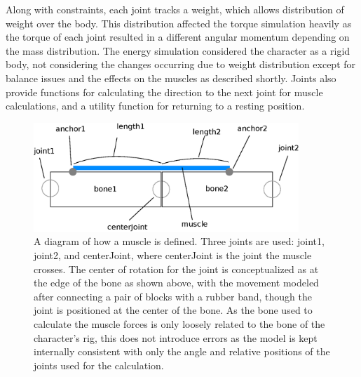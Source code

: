 Along with constraints, each joint tracks a weight, which allows distribution of weight over the body.  This distribution affected the torque simulation heavily as the torque of each joint resulted in a different angular momentum depending on the mass distribution.  The energy simulation considered the character as a rigid body, not considering the changes occurring due to weight distribution except for balance issues and the effects on the muscles as described shortly.  Joints also provide functions for calculating the direction to the next joint for muscle calculations, and a utility function for returning to a resting position.

\begin{figure}[ht]
	\centering
	\includegraphics[width=10cm]{images/spring_calc/spring_anchors.eps}
	\caption[Diagram of muscle definition showing anchor points and joints used for specification]{A diagram of how a muscle is defined.  Three joints are used: joint1, joint2, and centerJoint, where centerJoint is the joint the muscle crosses.  The center of rotation for the joint is conceptualized as at the edge of the bone as shown above, with the movement modeled after connecting a pair of blocks with a rubber band, though the joint is positioned at the center of the bone.  As the bone used to calculate the muscle forces is only loosely related to the bone of the character's rig, this does not introduce errors as the model is kept internally consistent with only the angle and relative positions of the joints used for the calculation.}
	\label{fig:muscle_anchors}
\end{figure}

